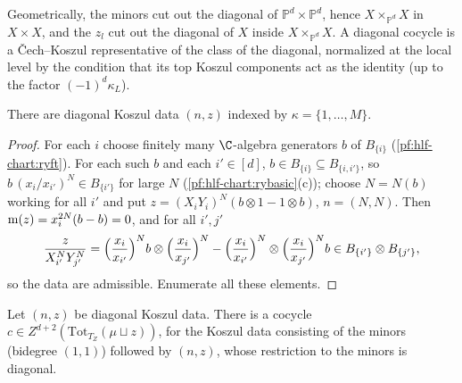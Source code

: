 Geometrically, the minors cut out the diagonal of $\mathbb P^d\times\mathbb P^d$, hence $X\times_{\mathbb P^d}X$ in $X\times X$, and the $z_l$ cut out the
diagonal of $X$ inside $X\times_{\mathbb P^d}X$. A diagonal cocycle is a \v{C}ech--Koszul representative of the class of the diagonal, normalized
at the local level by the condition that its top Koszul components act as the identity (up to the factor $(-1)^d\kappa_L$).

\begin{lemma}\label{pf:hlf-chart:zfam}
There are diagonal Koszul data $(n,z)$ indexed by $\kappa=\{1,\dots,M\}$.
\end{lemma}

\begin{proof}
For each $i$ choose finitely many $\C$-algebra generators $b$ of $B_{\{i\}}$ (\cref{pf:hlf-chart:ryft}). For each such $b$ and each $i'\in[d]$,
$b\in B_{\{i\}}\subseteq B_{\{i,i'\}}$, so $b\,(x_i/x_{i'})^{N}\in B_{\{i'\}}$ for large $N$ (\cref{pf:hlf-chart:rybasic}(c)); choose $N=N(b)$ working for all
$i'$ and put $z=(X_iY_i)^N(b\otimes1-1\otimes b)$, $n=(N,N)$. Then $\operatorname{m}(z)=x_i^{2N}(b-b)=0$, and for all $i',j'$
\[
  \frac{z}{X_{i'}^NY_{j'}^N}=\Bigl(\frac{x_i}{x_{i'}}\Bigr)^Nb\otimes\Bigl(\frac{x_i}{x_{j'}}\Bigr)^N-\Bigl(\frac{x_i}{x_{i'}}\Bigr)^N\otimes\Bigl(\frac{x_i}{x_{j'}}\Bigr)^Nb
  \in B_{\{i'\}}\otimes B_{\{j'\}},
\]
so the data are admissible. Enumerate all these elements.
\end{proof}

\begin{lemma}\label{pf:hlf-chart:zex}
Let $(n,z)$ be diagonal Koszul data. There is a cocycle $c\in Z^{d+2}(\mathrm{Tot}_{T_Z}(\mu\sqcup z))$, for the Koszul data consisting of the minors
(bidegree $(1,1)$) followed by $(n,z)$, whose restriction to the minors is diagonal.
\end{lemma}

